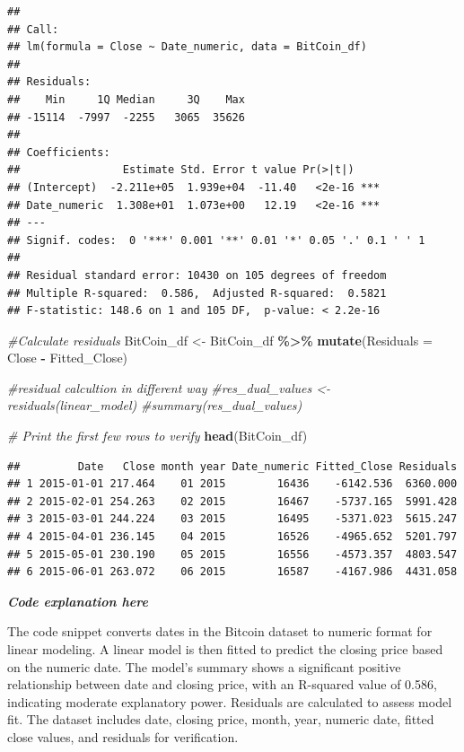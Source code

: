 \documentclass[
]{book}
\newenvironment{Shaded}{\begin{snugshade}}{\end{snugshade}}
\newcommand{\AttributeTok}[1]{\textcolor[rgb]{0.13,0.29,0.53}{#1}}
\newcommand{\CommentTok}[1]{\textcolor[rgb]{0.56,0.35,0.01}{\textit{#1}}}
\newcommand{\FunctionTok}[1]{\textcolor[rgb]{0.13,0.29,0.53}{\textbf{#1}}}
\newcommand{\NormalTok}[1]{#1}
\newcommand{\OtherTok}[1]{\textcolor[rgb]{0.56,0.35,0.01}{#1}}
\newcommand{\SpecialCharTok}[1]{\textcolor[rgb]{0.81,0.36,0.00}{\textbf{#1}}}
\begin{document}
\begin{verbatim}
## 
## Call:
## lm(formula = Close ~ Date_numeric, data = BitCoin_df)
## 
## Residuals:
##    Min     1Q Median     3Q    Max 
## -15114  -7997  -2255   3065  35626 
## 
## Coefficients:
##                Estimate Std. Error t value Pr(>|t|)    
## (Intercept)  -2.211e+05  1.939e+04  -11.40   <2e-16 ***
## Date_numeric  1.308e+01  1.073e+00   12.19   <2e-16 ***
## ---
## Signif. codes:  0 '***' 0.001 '**' 0.01 '*' 0.05 '.' 0.1 ' ' 1
## 
## Residual standard error: 10430 on 105 degrees of freedom
## Multiple R-squared:  0.586,  Adjusted R-squared:  0.5821 
## F-statistic: 148.6 on 1 and 105 DF,  p-value: < 2.2e-16
\end{verbatim}

\begin{Shaded}
\begin{Highlighting}[]
\CommentTok{\#Calculate residuals}
\NormalTok{BitCoin\_df }\OtherTok{\textless{}{-}}\NormalTok{ BitCoin\_df }\SpecialCharTok{\%\textgreater{}\%}
\FunctionTok{mutate}\NormalTok{(}\AttributeTok{Residuals =}\NormalTok{ Close }\SpecialCharTok{{-}}\NormalTok{ Fitted\_Close)}

\CommentTok{\#residual calcultion in different way}
\CommentTok{\#res\_dual\_values \textless{}{-} residuals(linear\_model)}
\CommentTok{\#summary(res\_dual\_values)}



\CommentTok{\# Print the first few rows to verify}
\FunctionTok{head}\NormalTok{(BitCoin\_df)}
\end{Highlighting}
\end{Shaded}

\begin{verbatim}
##         Date   Close month year Date_numeric Fitted_Close Residuals
## 1 2015-01-01 217.464    01 2015        16436    -6142.536  6360.000
## 2 2015-02-01 254.263    02 2015        16467    -5737.165  5991.428
## 3 2015-03-01 244.224    03 2015        16495    -5371.023  5615.247
## 4 2015-04-01 236.145    04 2015        16526    -4965.652  5201.797
## 5 2015-05-01 230.190    05 2015        16556    -4573.357  4803.547
## 6 2015-06-01 263.072    06 2015        16587    -4167.986  4431.058
\end{verbatim}

\emph{\textbf{Code explanation here}}

The code snippet converts dates in the Bitcoin dataset to numeric format for linear modeling. A linear model is then fitted to predict the closing price based on the numeric date. The model's summary shows a significant positive relationship between date and closing price, with an R-squared value of 0.586, indicating moderate explanatory power. Residuals are calculated to assess model fit. The dataset includes date, closing price, month, year, numeric date, fitted close values, and residuals for verification.
\end{document}
